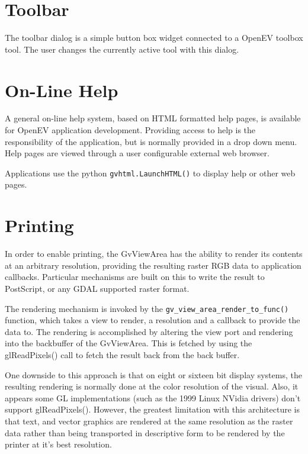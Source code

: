 \documentclass{openevreport}
\begin{document}
\section{Toolbar}

The toolbar dialog is a simple button box widget connected to a OpenEV
toolbox tool.  The user changes the currently active tool with this
dialog.

\section{On-Line Help}
\label{sec:online-help}

A general on-line help system, based on HTML formatted help pages, is
available for OpenEV application development.  Providing access to help
is the responsibility of the application, but is normally provided in
a drop down menu.  Help pages are viewed through a user configurable
external web browser.

Applications use the python {\tt gvhtml.LaunchHTML()} to display help or
other web pages.  

\section{Printing}

In order to enable printing, the GvViewArea has the ability to render
its contents at an arbitrary resolution, providing the resulting raster 
RGB data to application callbacks.  Particular mechanisms are built on
this to write the result to PostScript, or any GDAL supported raster format.

The rendering mechanism is invoked by the 
{\tt gv\_view\_area\_render\_to\_func() }
function, which takes a view to render, a resolution and a callback to 
provide the data to. The rendering is accomplished by altering the view port
and rendering into the backbuffer of the GvViewArea.  This is fetched
by using the glReadPixels() call to fetch the result back from the
back buffer.  

One downside to this approach is that on eight or sixteen bit
display systems, the resulting rendering is normally done at the
color resolution of the visual.  Also, it appears some GL implementations
(such as the 1999 Linux NVidia drivers) don't support glReadPixels(). 
However, the greatest limitation with this architecture is that text, and
vector graphics are rendered at the same resolution as the raster data
rather than being transported in descriptive form to be rendered by the
printer at it's best resolution.  
\end{document}

